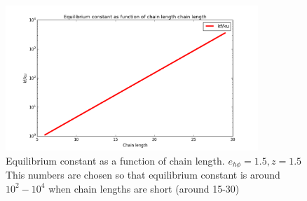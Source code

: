\documentclass[12pt]{paper}
\begin{document}
\begin{figure}[h!]
  \centering
  \includegraphics[width=0.85\textwidth]{pictures/K.png} 
  \caption{Equilibrium constant as a function of chain length. $e_{h\phi}=1.5,z=1.5$ This numbers 
are 
chosen so that equilibrium constant is around 
$10^2-10^4$ when chain lengths are short (around 15-30)}
  \label{fig:k_unf_N}
\end{figure}
\end{document}
